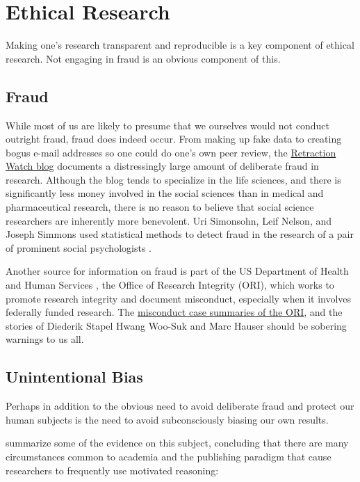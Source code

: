 \documentclass[12pt] {article}
\begin{document}
\section{Ethical Research}\label{ethical-research}

Making one's research transparent and reproducible is a key component of ethical research. Not engaging in fraud is an obvious component of this.

\subsection{Fraud}\label{fraud}

While most of us are likely to presume that we ourselves would not
conduct outright fraud, fraud does indeed occur. From making up fake
data to creating bogus e-mail addresses so one could do one's own peer
review, the \href{http://www.retractionwatch.com}{Retraction Watch blog}
documents a distressingly large amount of deliberate fraud in research.
Although the blog tends to specialize in the life sciences, and there is significantly less money involved in the social sciences than in medical and pharmaceutical research, there is no reason to believe that social science researchers are inherently
more benevolent. Uri Simonsohn, Leif Nelson, and Joseph Simmons used statistical methods to detect fraud in the research of a pair of prominent social psychologists \citep{simonsohn2013just}. 

Another source for information on fraud is part of the US Department of Health and Human Services
, the Office of Research Integrity (ORI), which works to promote research
integrity and document misconduct, especially when it involves federally
funded research. The \href{http://ori.hhs.gov/case_summary}{misconduct case summaries of the ORI}, and the stories of Diederik Stapel \citep{carey_noted_2011, bhattacharjee_diederik_2013} Hwang Woo-Suk \citep{cyranoski_cloning_2014}
and Marc Hauser \citep{johnson_harvard_2012} should be sobering warnings to us all.

\subsection{Unintentional Bias}\label{unintentional-bias}

Perhaps in addition to the obvious need to avoid deliberate fraud and
protect our human subjects is the need to avoid subconsciously biasing
our own results.

\cite{nosek_scientific_2012} summarize some of the evidence on this
subject, concluding that there are many circumstances common to academia
and the publishing paradigm that cause researchers to frequently use
motivated reasoning:
\end{document}
